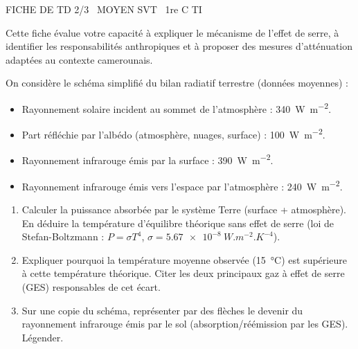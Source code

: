 \documentclass[11pt]{article}
\begin{document}
\begin{tcolorbox}[enhanced,colback=popink,colframe=popink,arc=10pt,boxrule=0pt,left=12pt,right=12pt,top=9pt,bottom=9pt]
{\color{white}\popxbold\small FICHE DE TD 2/3 \textbullet\ MOYEN \hfill SVT \textbullet\ 1re C TI\par}
\end{tcolorbox}
\vspace{4pt}
Cette fiche évalue votre capacité à expliquer le mécanisme de l'effet de serre, à identifier les responsabilités anthropiques et à proposer des mesures d'atténuation adaptées au contexte camerounais.

\begin{exercice}
\label{exo:mecanisme}
On considère le schéma simplifié du bilan radiatif terrestre (données moyennes) : 
\begin{itemize}
    \item Rayonnement solaire incident au sommet de l'atmosphère : \SI{340}{W.m^{-2}}.
    \item Part réfléchie par l'albédo (atmosphère, nuages, surface) : \SI{100}{W.m^{-2}}.
    \item Rayonnement infrarouge émis par la surface : \SI{390}{W.m^{-2}}.
    \item Rayonnement infrarouge émis vers l'espace par l'atmosphère : \SI{240}{W.m^{-2}}.
\end{itemize}
\begin{enumerate}
    \item Calculer la puissance absorbée par le système Terre (surface + atmosphère). En déduire la température d'équilibre théorique sans effet de serre (loi de Stefan-Boltzmann : $P = \sigma T^4$, $\sigma = \SI{5.67e-8}{W.m^{-2}.K^{-4}}$).
    \item Expliquer pourquoi la température moyenne observée (\SI{15}{\celsius}) est supérieure à cette température théorique. Citer les deux principaux gaz à effet de serre (GES) responsables de cet écart.
    \item Sur une copie du schéma, représenter par des flèches le devenir du rayonnement infrarouge émis par le sol (absorption/réémission par les GES). Légender.
\end{enumerate}
\end{exercice}
\end{document}
